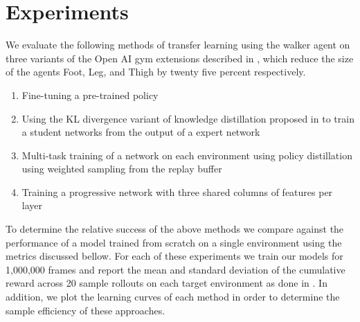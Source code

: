 \section{Experiments}
We evaluate the following methods of transfer learning using the walker agent on
three variants of the Open AI gym extensions described in \cite{four}, which
reduce the size of the agents Foot, Leg, and Thigh by twenty five percent respectively.

\begin{enumerate}
    \item Fine-tuning a pre-trained policy
    \item Using the KL divergence variant of knowledge distillation proposed in \cite{two}
          to train a student networks from the output of a expert network
    \item Multi-task training of a network on each environment using policy distillation
          using weighted sampling from the replay buffer
    \item Training a progressive network with three shared columns of features per layer
\end{enumerate}

To determine the relative success of the above methods we compare against the performance of
a model trained from scratch on a single environment using the metrics discussed bellow.
For each of these experiments we train our models for 1,000,000 frames and report the
mean and standard deviation of the cumulative reward across 20 sample rollouts on each
target environment as done in \cite{four}. In addition, we plot the learning curves of
each method in order to determine the sample efficiency of these approaches.
